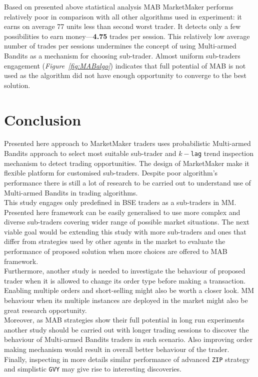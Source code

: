 \documentclass{llncs}
\begin{document}
Based on presented above statistical analysis MAB MarketMaker performs relatively poor in comparison with all other algorithms used in experiment: it earns on average 77 units less than second worst trader. It detects only a few possibilities to earn money---\textbf{4.75} trades per session. This relatively low average number of trades per sessions undermines the concept of using Multi-armed Bandits as a mechanism for choosing sub-trader. Almost uniform sub-traders engagement (\emph{Figure~\ref{fig:MABalgo}}) indicates that full potential of MAB is not used as the algorithm did not have enough opportunity to converge to the best solution.


\section{Conclusion}
Presented here approach to MarketMaker traders uses probabilistic Multi-armed Bandits approach to select most suitable sub-trader and $k-$\texttt{lag} trend inspection mechanism to detect trading opportunities. The design of MarketMaker make it flexible platform for customised sub-traders. Despite poor algorithm's performance there is still a lot of research to be carried out to understand use of Multi-armed Bandits in trading algorithms.\\

This study engages only predefined in BSE traders as a sub-traders in MM. Presented here framework can be easily generalised to use more complex and diverse sub-traders covering wider range of possible market situations. The next viable goal would be extending this study with more sub-traders and ones that differ from strategies used by other agents in the market to evaluate the performance of proposed solution when more choices are offered to MAB framework.\\
Furthermore, another study is needed to investigate the behaviour of proposed trader when it is allowed to change its order type before making a transaction. Enabling multiple orders and short-selling might also be worth a closer look. MM behaviour when its multiple instances are deployed in the market might also be great research opportunity.\\
Moreover, as MAB strategies show their full potential in long run experiments another study should be carried out with longer trading sessions to discover the behaviour of Multi-armed Bandits traders in such scenario. Also improving order making mechanism would result in overall better behaviour of the trader.\\
Finally, inspecting in more details similar performance of advanced \texttt{ZIP} strategy and simplistic \texttt{GVY} may give rise to interesting discoveries.\\
\end{document}
